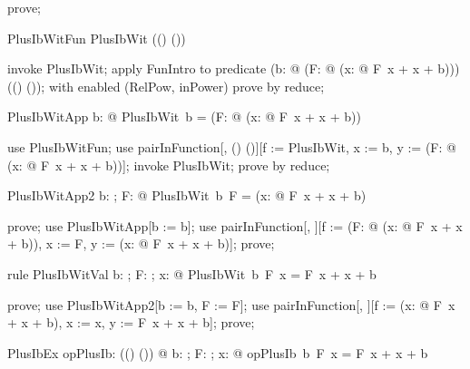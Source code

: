 \documentclass{article}
\begin{document}
\begin{zproof}
prove;
\end{zproof}

\begin{theorem}{PlusIbWitFun}
  PlusIbWit \in \nat \fun ((\nat \fun \nat) \fun (\nat \fun \nat))
\end{theorem}

\begin{zproof}
invoke PlusIbWit;
apply FunIntro to predicate (\lambda b: \nat @ (\lambda F: \nat \fun \nat @ (\lambda x: \nat @ F~x + x + b))) \in \nat \fun ((\nat \fun \nat) \fun (\nat \fun \nat));
with enabled (RelPow, inPower) prove by reduce;
\end{zproof}

\begin{theorem}{PlusIbWitApp}
  \forall b: \nat @ PlusIbWit~b = (\lambda F: \nat \fun \nat @ (\lambda x: \nat @ F~x + x + b))
\end{theorem}

\begin{zproof}
use PlusIbWitFun;
use pairInFunction[\nat, (\nat \fun \nat) \fun (\nat \fun \nat)][f := PlusIbWit, x := b, y := (\lambda F: \nat \fun \nat @ (\lambda x: \nat @ F~x + x + b))];
invoke PlusIbWit;
prove by reduce;
\end{zproof}

\begin{theorem}{PlusIbWitApp2}
  \forall b: \nat; F: \nat \fun \nat @ PlusIbWit~b~F = (\lambda x: \nat @ F~x + x + b)
\end{theorem}

\begin{zproof}
prove;
use PlusIbWitApp[b := b];
use pairInFunction[\nat \fun \nat, \nat \fun \nat][f := (\lambda F: \nat \fun \nat @ (\lambda x: \nat @ F~x + x + b)), x := F, y := (\lambda x: \nat @ F~x + x + b)];
prove;
\end{zproof}

\begin{theorem}{rule PlusIbWitVal}
  \forall b: \nat; F: \nat \fun \nat; x: \nat @ PlusIbWit~b~F~x = F~x + x + b
\end{theorem}

\begin{zproof}
prove;
use PlusIbWitApp2[b := b, F := F];
use pairInFunction[\nat, \nat][f := (\lambda x: \nat @ F~x + x + b), x := x, y := F~x + x + b];
prove;
\end{zproof}

\begin{theorem}{PlusIbEx}
  \exists opPlusIb: \nat \fun ((\nat \fun \nat) \fun (\nat \fun \nat)) @
    \forall b: \nat; F: \nat \fun \nat; x: \nat @ opPlusIb~b~F~x = F~x + x + b
\end{theorem}
\end{document}
